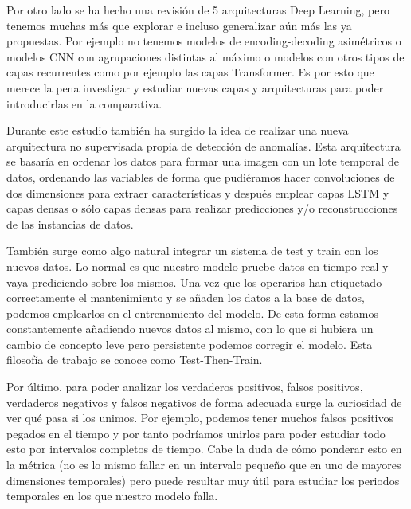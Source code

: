 Por otro lado se ha hecho una revisión de 5 arquitecturas Deep Learning, pero tenemos muchas más que explorar e incluso generalizar aún más las ya propuestas. Por ejemplo no tenemos modelos de encoding-decoding asimétricos o modelos CNN con agrupaciones distintas al máximo o modelos con otros tipos de capas recurrentes como por ejemplo las capas Transformer. Es por esto que merece la pena investigar y estudiar nuevas capas y arquitecturas para poder introducirlas en la comparativa.

Durante este estudio también ha surgido la idea de realizar una nueva arquitectura no supervisada propia de detección de anomalías. Esta arquitectura se basaría en ordenar los datos para formar una imagen con un lote temporal de datos, ordenando las variables de forma que pudiéramos hacer convoluciones de dos dimensiones para extraer características y después emplear capas LSTM y capas densas o sólo capas densas para realizar predicciones y/o reconstrucciones de las instancias de datos.

También surge como algo natural integrar un sistema de test y train con los nuevos datos. Lo normal es que nuestro modelo pruebe datos en tiempo real y vaya prediciendo sobre los mismos. Una vez que los operarios han etiquetado correctamente el mantenimiento y se añaden los datos a la base de datos, podemos emplearlos en el entrenamiento del modelo. De esta forma estamos constantemente añadiendo nuevos datos al mismo, con lo que si hubiera un cambio de concepto leve pero persistente podemos corregir el modelo. Esta filosofía de trabajo se conoce como Test-Then-Train.

Por último, para poder analizar los verdaderos positivos, falsos positivos, verdaderos negativos y falsos negativos de forma adecuada surge la curiosidad de ver qué pasa si los unimos. Por ejemplo, podemos tener muchos falsos positivos pegados en el tiempo y por tanto podríamos unirlos para poder estudiar todo esto por intervalos completos de tiempo. Cabe la duda de cómo ponderar esto en la métrica (no es lo mismo fallar en un intervalo pequeño que en uno de mayores dimensiones temporales) pero puede resultar muy útil para estudiar los periodos temporales en los que nuestro modelo falla.